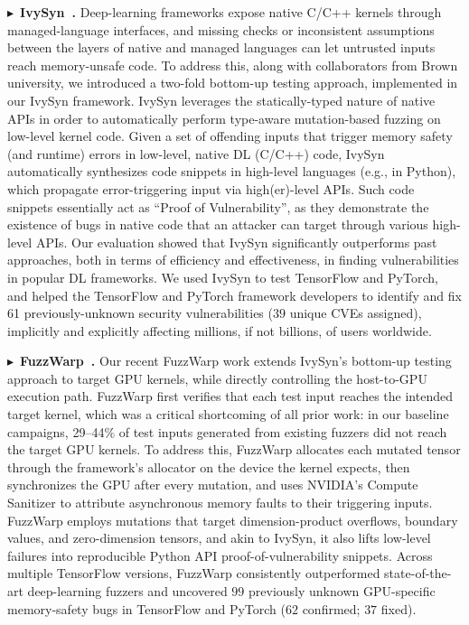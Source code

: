 \documentclass[10pt,letterpaper]{article}
\newcommand{\project}[2]{\par\Needspace{6\baselineskip}\noindent
  $\blacktriangleright$~\textbf{#1~\cite{#2}.}}
\begin{document}
\project{IvySyn}{ivysyn}
Deep-learning frameworks expose native C/C++ kernels through managed-language
interfaces, and missing checks or inconsistent assumptions between the layers of
native and managed languages can let untrusted inputs reach memory-unsafe code.
To address this, along with collaborators from Brown university, we
introduced a two-fold bottom-up testing approach, implemented in
our IvySyn framework. IvySyn leverages the statically-typed nature of native
APIs in order to automatically perform type-aware mutation-based fuzzing
on low-level kernel code. Given a set of offending inputs that trigger memory
safety (and runtime) errors in low-level, native DL (C/C++) code, IvySyn
automatically synthesizes code snippets in high-level languages (e.g., in
Python), which propagate error-triggering input via high(er)-level APIs.
Such code snippets essentially act as ``Proof of Vulnerability'',
as they demonstrate the existence of bugs in native code that an attacker
can target through various high-level APIs. Our evaluation showed that IvySyn
significantly outperforms past approaches, both in terms of efficiency and
effectiveness, in finding vulnerabilities in popular DL frameworks. We used
IvySyn to test TensorFlow and PyTorch, and helped the TensorFlow and PyTorch
framework developers to identify and fix 61 previously-unknown security
vulnerabilities ($39$ unique CVEs assigned), implicitly and explicitly
affecting millions, if not billions, of users worldwide.

\project{FuzzWarp}{fuzzwarp}
Our recent FuzzWarp work extends IvySyn's bottom-up testing approach to target
GPU kernels, while directly controlling the host-to-GPU execution path. FuzzWarp
first verifies that each test input reaches the intended target kernel, which was
a critical shortcoming of all prior work: in our baseline campaigns, 29--44\%
of test inputs generated from existing fuzzers did not reach the target GPU kernels.
To address this, FuzzWarp allocates each mutated
tensor through the framework's allocator on the device the kernel expects,
then synchronizes the GPU after every mutation, and uses NVIDIA's Compute
Sanitizer to attribute asynchronous memory faults to their triggering inputs.
FuzzWarp employs mutations that target dimension-product overflows, boundary values, and
zero-dimension tensors, and akin to IvySyn, it also lifts low-level
failures into reproducible Python API proof-of-vulnerability snippets. Across
multiple TensorFlow versions, FuzzWarp consistently outperformed state-of-the-art
deep-learning fuzzers
and uncovered $99$ previously unknown GPU-specific memory-safety bugs in
TensorFlow and PyTorch ($62$ confirmed; $37$ fixed).
\end{document}
